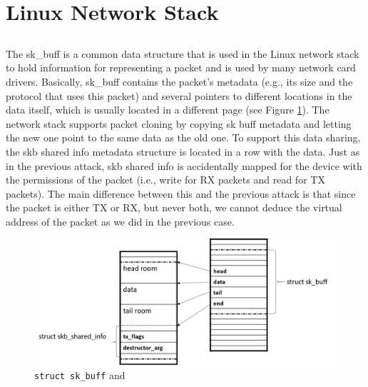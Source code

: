\section{Linux Network Stack}

\subsection{\shinfo}
The sk\_buff is a common data structure that is used in the Linux network stack to hold information for representing a packet and is used by many network card drivers. Basically, sk\_buff contains the packet’s metadata (e.g., its size and the protocol that uses this packet) and several pointers to different locations in the data itself, which is usually located in a different page (see Figure \ref{fig:sh_info}). The network stack supports packet cloning by copying sk buff metadata and letting the new one point to the same data as the old one. To support this data sharing, the skb shared info metadata structure is located in a row with the data. Just as in the previous attack, skb shared info is accidentally mapped for the device with the permissions of the packet (i.e., write for RX packets and read for TX packets). The main difference between this and the previous attack is that since the packet is either TX or RX, but never both, we cannot deduce the virtual address of the packet as we did in the previous case.

\begin{figure}
    \centering
    \includegraphics[width=1.2\linewidth]{figs/skb.png}
    \caption{\texttt{struct sk\_buff} and \shinfo}
    \label{fig:sh_info}
\end{figure}

